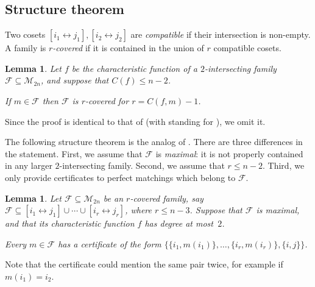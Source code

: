 \documentclass[10pt,a4paper]{amsart}
\newtheorem{lemma}[theorem]{Lemma}
\theoremstyle{definition}
\providecommand{\dcoset}[2]{[#1 \leftrightarrow #2]}
\providecommand{\cM}{\mathcal{M}}
\begin{document}
\subsection{Structure theorem} \label{sec:structure-pms}

Two cosets $\dcoset{i_1}{j_1},\dcoset{i_2}{j_2}$ are \emph{compatible} if their intersection is non-empty. A family is \emph{$r$-covered} if it is contained in the union of $r$ compatible cosets.

\begin{lemma} \label{lem:covering-pms}
Let $f$ be the characteristic function of a $2$-intersecting family $\mathcal{F} \subseteq \cM_{2n}$, and suppose that $C(f) \leq n-2$.

If $m \in \mathcal{F}$ then $\mathcal{F}$ is $r$-covered for $r = C(f,m) - 1$.
\end{lemma}

Since the proof is identical to that of  (with  standing for ), we omit it.

The following structure theorem is the analog of . There are three differences in the statement. First, we assume that $\mathcal{F}$ is \emph{maximal}: it is not properly contained in any larger $2$-intersecting family. Second, we assume that $r \leq n-2$. Third, we only provide certificates to perfect matchings which belong to $\mathcal{F}$.

\begin{lemma} \label{lem:structure-pms}
Let $\mathcal{F} \subseteq \cM_{2n}$ be an $r$-covered family, say $\mathcal{F} \subseteq \dcoset{i_1}{j_1} \cup \cdots \cup \dcoset{i_r}{j_r}$, where $r \leq n-3$. Suppose that $\mathcal{F}$ is maximal, and that its characteristic function $f$ has degree at most~$2$.

Every $m \in \mathcal{F}$ has a certificate of the form $\bigl\{\{i_1,m(i_1)\},\ldots,\{i_r,m(i_r)\},\{i,j\}\bigr\}$.
\end{lemma}

Note that the certificate could mention the same pair twice, for example if $m(i_1) = i_2$.
\end{document}
